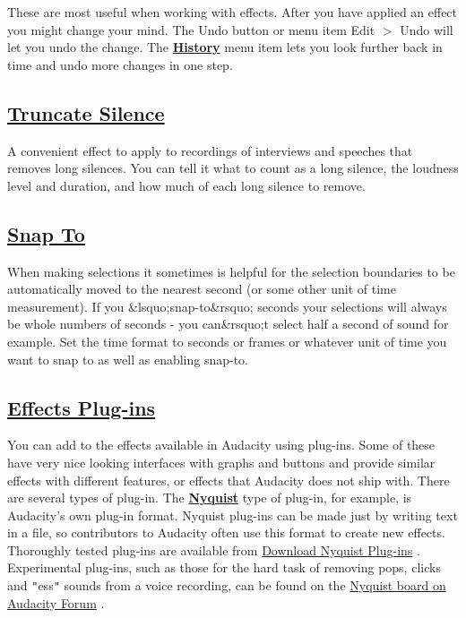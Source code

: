 \documentclass[]{book}
\begin{document}
\begin{multicols}{2}
These are most useful when working with effects.  After you have applied an effect you might change your mind.  The Undo button or menu item Edit \mbox{$>$} Undo will let you undo the change. The \textbf{
\hyperref[undo_redo_and_history__history]{History}
} menu item lets you look further back in time and undo more changes in one step.

\subsection{
\hyperref[truncate_silence_]{Truncate Silence}
}


A convenient effect to apply to recordings of interviews and speeches that removes long silences.  You can tell it what to count as a long silence, the loudness level and duration, and how much of each long silence to remove.

\subsection{
\hyperref[selection_toolbar__snap]{Snap To}
}


When making selections it sometimes is helpful for the selection boundaries to be automatically moved to the nearest second (or some other unit of time measurement).  If you \&lsquo;snap-to\&rsquo; seconds your selections will always be whole numbers of seconds - you can\&rsquo;t select half a second of sound for example.  Set the time format to seconds or frames or whatever unit of time you want to snap to as well as enabling snap-to.

\subsection{
\hyperref[customization__plug-ins]{Effects Plug-ins}
}


You can add to the effects available in Audacity using plug-ins.  Some of these have very nice looking interfaces with graphs and buttons and provide similar effects with different features, or effects that Audacity does not ship with. There are several types of plug-in. The \textbf{
\hyperref[customization__plug-ins]{Nyquist}
} type of plug-in, for example, is Audacity's own plug-in format. Nyquist plug-ins can be made just by writing text in a file, so contributors to Audacity often use this format to create new effects. Thoroughly tested plug-ins are available from 
\hyperref[https:__wiki.audacityteam.org_wiki_Download_Nyquist_Plug-ins]{Download Nyquist Plug-ins}
. Experimental plug-ins, such as those for the hard task of removing pops, clicks and \texttt{{}"{}}ess\texttt{{}"{}} sounds from a voice recording, can be found on the 
\hyperref[https:__forum.audacityteam.org_viewforum.php?f=39]{Nyquist board on Audacity Forum}
.


\end{multicols}
\end{document}
